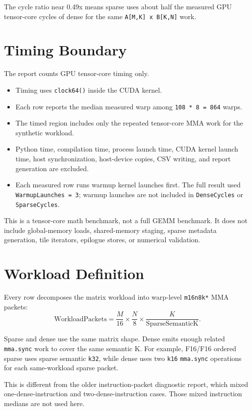 \documentclass[10pt]{article}
\begin{document}
The cycle ratio near 0.49x means sparse uses about half the measured GPU
tensor-core cycles of dense for the same \texttt{A[M,K] x B[K,N]} work.

\section{Timing Boundary}

The report counts GPU tensor-core timing only.

\begin{itemize}
\item Timing uses \texttt{clock64()} inside the CUDA kernel.
\item Each row reports the median measured warp among \texttt{108 * 8 = 864}
warps.
\item The timed region includes only the repeated tensor-core MMA work for the
synthetic workload.
\item Python time, compilation time, process launch time, CUDA kernel launch
time, host synchronization, host-device copies, CSV writing, and report
generation are excluded.
\item Each measured row runs warmup kernel launches first. The full result used
\texttt{WarmupLaunches = 3}; warmup launches are not included in
\texttt{DenseCycles} or \texttt{SparseCycles}.
\end{itemize}

This is a tensor-core math benchmark, not a full GEMM benchmark. It does not
include global-memory loads, shared-memory staging, sparse metadata generation,
tile iterators, epilogue stores, or numerical validation.

\section{Workload Definition}

Every row decomposes the matrix workload into warp-level \texttt{m16n8k*} MMA
packets:
\[
\mathrm{WorkloadPackets} =
\frac{M}{16} \times \frac{N}{8} \times \frac{K}{\mathrm{SparseSemanticK}}.
\]

Sparse and dense use the same matrix shape. Dense emits enough related
\texttt{mma.sync} work to cover the same semantic K. For example, F16/F16
ordered sparse uses sparse semantic \texttt{k32}, while dense uses two
\texttt{k16} \texttt{mma.sync} operations for each same-workload sparse packet.

This is different from the older instruction-packet diagnostic report, which
mixed one-dense-instruction and two-dense-instruction cases. Those mixed
instruction medians are not used here.
\end{document}
